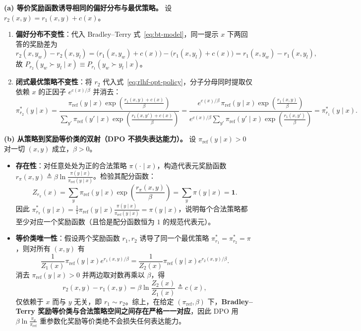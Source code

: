 
\textbf{(a) 等价奖励函数诱导相同的偏好分布与最优策略。} 设 $r_2(x, y) = r_1(x, y) + c(x)$。
\begin{enumerate}
  \item \textbf{偏好分布不变性}：代入 Bradley--Terry 式~\eqref{eq:bt-model}，同一提示 $x$ 下两回答的奖励差为
  \[
    r_2(x, y_w) - r_2(x, y_l) = \big(r_1(x, y_w) + c(x)\big) - \big(r_1(x, y_l) + c(x)\big) = r_1(x, y_w) - r_1(x, y_l),
  \]
  故 $P_{r_2}(y_w \succ y_l \mid x) \equiv P_{r_1}(y_w \succ y_l \mid x)$。
  \item \textbf{闭式最优策略不变性}：将 $r_2$ 代入式~\eqref{eq:rlhf-opt-policy}，分子分母同时提取仅依赖 $x$ 的正因子 $e^{c(x)/\beta}$ 并消去：
  \[
    \pi_{r_2}^*(y \mid x)
    = \frac{\pi_{\mathrm{ref}}(y \mid x)\exp\!\left(\frac{r_1(x, y) + c(x)}{\beta}\right)}{\sum_{y'} \pi_{\mathrm{ref}}(y' \mid x)\exp\!\left(\frac{r_1(x, y') + c(x)}{\beta}\right)}
    = \frac{e^{c(x)/\beta}\,\pi_{\mathrm{ref}}(y \mid x)\exp\!\left(\frac{r_1(x, y)}{\beta}\right)}{e^{c(x)/\beta}\sum_{y'} \pi_{\mathrm{ref}}(y' \mid x)\exp\!\left(\frac{r_1(x, y')}{\beta}\right)}
    = \pi_{r_1}^*(y \mid x).
  \]
\end{enumerate}

\textbf{(b) 从策略到奖励等价类的双射（DPO 不损失表达能力）。} 设 $\pi_{\mathrm{ref}}(y \mid x) > 0$ 对一切 $(x, y)$ 成立，$\beta > 0$。
\begin{itemize}
  \item \textbf{存在性}：对任意处处为正的合法策略 $\pi(\cdot \mid x)$，构造代表元奖励函数 $r_\pi(x, y) \triangleq \beta \ln\frac{\pi(y \mid x)}{\pi_{\mathrm{ref}}(y \mid x)}$。检验其配分函数：
  \[
    Z_{r_\pi}(x) = \sum_{y} \pi_{\mathrm{ref}}(y \mid x) \exp\!\left(\frac{r_\pi(x, y)}{\beta}\right) = \sum_y \pi(y \mid x) = \mathbf{1}.
  \]
  因此 $\pi_{r_\pi}^*(y \mid x) = \frac{1}{1}\pi_{\mathrm{ref}}(y \mid x)\frac{\pi(y \mid x)}{\pi_{\mathrm{ref}}(y \mid x)} = \pi(y \mid x)$，说明每个合法策略都至少对应一个奖励函数（且恰是配分函数恒为 $1$ 的规范代表元）。
  \item \textbf{等价类唯一性}：假设两个奖励函数 $r_1, r_2$ 诱导了同一个最优策略 $\pi_{r_1}^* = \pi_{r_2}^* = \pi$，则对所有 $(x, y)$ 有
  \[
    \frac{1}{Z_1(x)}\pi_{\mathrm{ref}}(y \mid x) e^{r_1(x,y)/\beta} = \frac{1}{Z_2(x)}\pi_{\mathrm{ref}}(y \mid x) e^{r_2(x,y)/\beta}.
  \]
  消去 $\pi_{\mathrm{ref}}(y \mid x) > 0$ 并两边取对数再乘以 $\beta$，得
  \[
    r_2(x, y) - r_1(x, y) = \beta \ln\frac{Z_2(x)}{Z_1(x)} \triangleq c(x),
  \]
  仅依赖于 $x$ 而与 $y$ 无关，即 $r_1 \sim r_2$。综上，在给定 $(\pi_{\mathrm{ref}}, \beta)$ 下，\textbf{Bradley--Terry 奖励等价类与合法策略空间之间存在严格一一对应}，因此 DPO 用 $\beta\ln\frac{\pi_\theta}{\pi_{\mathrm{ref}}}$ 重参数化奖励等价类绝不会损失任何表达能力。
\end{itemize}

